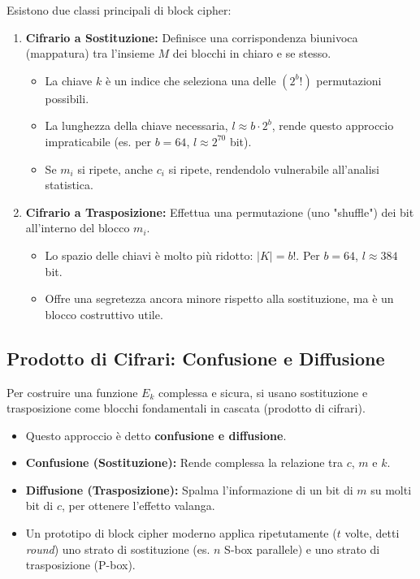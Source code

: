 \documentclass[../main.tex]{subfiles}
\begin{document}
Esistono due classi principali di block cipher:
\begin{enumerate}
	\item \textbf{Cifrario a Sostituzione:} Definisce una corrispondenza biunivoca (mappatura) tra l'insieme $M$ dei blocchi in chiaro e se stesso.
	      \begin{itemize}
	      	\item La chiave $k$ è un indice che seleziona una delle $(2^b!)$ permutazioni possibili.
	      	\item La lunghezza della chiave necessaria, $l \approx b \cdot 2^b$, rende questo approccio impraticabile (es. per $b=64$, $l \approx 2^{70}$ bit).
	      	\item Se $m_i$ si ripete, anche $c_i$ si ripete, rendendolo vulnerabile all'analisi statistica.
	      \end{itemize}
	\item \textbf{Cifrario a Trasposizione:} Effettua una permutazione (uno "shuffle") dei bit all'interno del blocco $m_i$.
	      \begin{itemize}
	      	\item Lo spazio delle chiavi è molto più ridotto: $|K| = b!$. Per $b=64$, $l \approx 384$ bit.
	      	\item Offre una segretezza ancora minore rispetto alla sostituzione, ma è un blocco costruttivo utile.
	      \end{itemize}
\end{enumerate}

\subsection{Prodotto di Cifrari: Confusione e Diffusione}
Per costruire una funzione $E_k$ complessa e sicura, si usano sostituzione e trasposizione come blocchi fondamentali in cascata (prodotto di cifrari).
\begin{itemize}
	\item Questo approccio è detto \textbf{confusione e diffusione}.
	\item \textbf{Confusione (Sostituzione):} Rende complessa la relazione tra $c$, $m$ e $k$.
	\item \textbf{Diffusione (Trasposizione):} Spalma l'informazione di un bit di $m$ su molti bit di $c$, per ottenere l'effetto valanga.
	\item Un prototipo di block cipher moderno applica ripetutamente ($t$ volte, detti \emph{round}) uno strato di sostituzione (es. $n$ S-box parallele) e uno strato di trasposizione (P-box).
\end{itemize}
\end{document}

